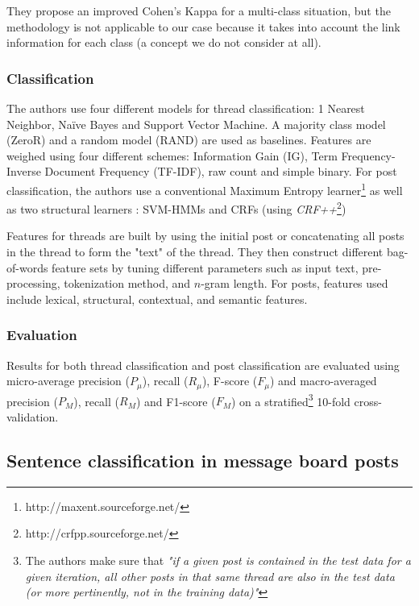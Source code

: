 \documentclass[11pt]{article}
\begin{document}
They propose an improved Cohen's Kappa for a multi-class situation, but the methodology is not applicable to our case because it takes into account the link information for each class (a concept we do not consider at all).

\subsubsection{Classification}

The authors use four different models for thread classification: 1 Nearest Neighbor, Naïve Bayes and Support Vector Machine. A majority class model (ZeroR) and a random model (RAND) are used as baselines. Features are weighed using four different schemes: Information Gain (IG), Term Frequency-Inverse Document Frequency (TF-IDF), raw count and simple binary. For post classification, the authors use a conventional Maximum Entropy learner\footnote{http://maxent.sourceforge.net/} as well as two structural learners : SVM-HMMs and CRFs (using \emph{CRF++}\footnote{http://crfpp.sourceforge.net/
})

Features for threads are built by using the initial post or concatenating all posts in the thread to form the "text" of the thread. They then construct different bag-of-words feature sets by tuning different parameters such as input text, pre-processing, tokenization method, and $n$-gram length. For posts, features used include lexical, structural, contextual, and semantic features.

\subsubsection{Evaluation}

Results for both thread classification and post classification are evaluated using micro-average precision ($P_{\mu}$), recall ($R_{\mu}$), F-score ($F_{\mu}$) and macro-averaged precision ($P_{M}$), recall ($R_{M}$) and F1-score ($F_{M}$) on a stratified\footnote{The authors make sure that \textit{"if a given post is contained in the test data for a given iteration, all other posts in that same thread are also in the test data (or more pertinently, not in the training data)"}} 10-fold cross-validation.

\subsection{Sentence classification in message board posts}
\end{document}
